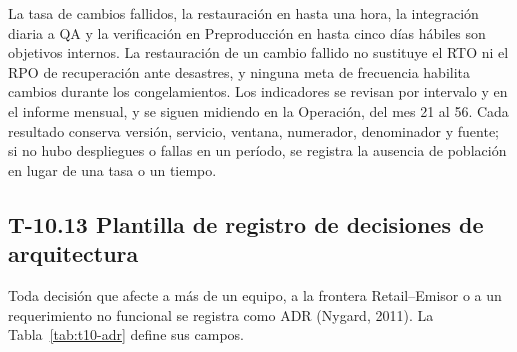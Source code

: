 \documentclass[11pt]{article}
\begin{document}
La tasa de cambios fallidos, la restauración en hasta una hora, la integración diaria a QA y la verificación en Preproducción en hasta cinco días hábiles son objetivos internos. La restauración de un cambio fallido no sustituye el RTO ni el RPO de recuperación ante desastres, y ninguna meta de frecuencia habilita cambios durante los congelamientos. Los indicadores se revisan por intervalo y en el informe mensual, y se siguen midiendo en la Operación, del mes 21 al 56. Cada resultado conserva versión, servicio, ventana, numerador, denominador y fuente; si no hubo despliegues o fallas en un período, se registra la ausencia de población en lugar de una tasa o un tiempo.

\subsection{T-10.13 Plantilla de registro de decisiones de arquitectura}\label{t10-13}

Toda decisión que afecte a más de un equipo, a la frontera Retail--Emisor o a un requerimiento no funcional se registra como ADR (Nygard, 2011). La Tabla~\mbox{\ref{tab:t10-adr}} define sus campos.
\end{document}
